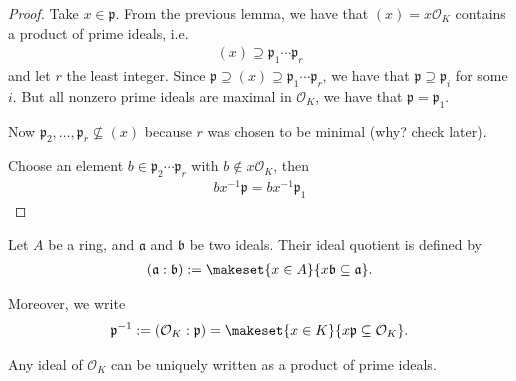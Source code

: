 \begin{proof}
    Take \(x \in \mathfrak{p}\). From the previous lemma, we have that \((x) = x \mathcal{O}_K\) contains a product of prime ideals, i.e.
    \begin{align*}
        (x) \supseteq \mathfrak{p}_1 \cdots \mathfrak{p}_r
    \end{align*}
    and let \(r\) the least integer. Since \(\mathfrak{p} \supseteq (x) \supseteq \mathfrak{p}_1 \cdots \mathfrak{p}_r\), we have that \(\mathfrak{p} \supseteq \mathfrak{p}_i\) for some \(i\). But all nonzero prime ideals are maximal in \(\mathcal{O}_K\), we have that \(\mathfrak{p} = \mathfrak{p}_1\).

    Now \(\mathfrak{p}_2, \ldots, \mathfrak{p}_r \not\subseteq (x)\) because \(r\) was chosen to be minimal (why? check later).

    Choose an element \(b \in \mathfrak{p}_2 \cdots \mathfrak{p}_r\) with \(b \not\in x\mathcal{O}_K\), then
    \begin{align*}
        bx^{-1}\mathfrak{p} = b x^{-1}\mathfrak{p}_1
    \end{align*}
\end{proof}

\begin{defbox}
    \begin{definition}
        Let \(A\) be a ring, and \(\mathfrak{a}\) and \(\mathfrak{b}\) be two ideals. Their ideal quotient is defined by
        \begin{align*}
            (\mathfrak{a} : \mathfrak{b}) := \makeset{x \in A}{x \mathfrak{b} \subseteq \mathfrak{a}} \text{.}
        \end{align*}

        Moreover, we write
        \begin{align*}
            \mathfrak{p}^{-1} := (\mathcal{O}_K : \mathfrak{p}) = \makeset{x \in K}{x \mathfrak{p} \subseteq \mathcal{O}_K} \text{.}
        \end{align*}
    \end{definition}
\end{defbox}

\begin{thmbox}
    \begin{theorem}
        Any {\color{mathif}ideal} of \(\mathcal{O}_K\) can be {\color{maththen}uniquely} written as a {\color{maththen}product} of {\color{maththen}prime ideals}.
    \end{theorem}
\end{thmbox}

